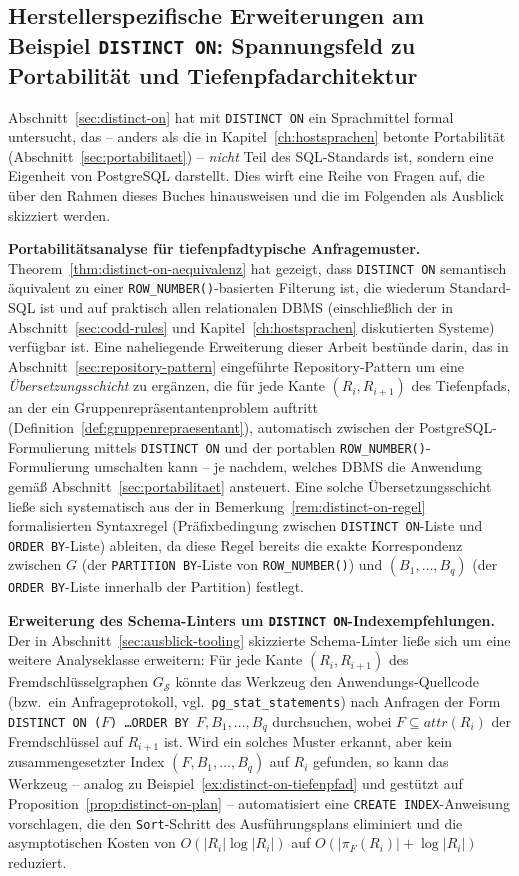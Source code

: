 ﻿\documentclass[a4paper,12pt]{report}
\theoremstyle{definition}
\theoremstyle{remark}
\newcommand{\att}{\mathit{attr}}
\begin{document}
\subsection{Herstellerspezifische Erweiterungen am Beispiel \texttt{DISTINCT ON}: Spannungsfeld zu Portabilität und Tiefenpfadarchitektur}
\label{sec:ausblick-distinct-on}

Abschnitt~\ref{sec:distinct-on} hat mit \texttt{DISTINCT ON} ein
Sprachmittel formal untersucht, das -- anders als die in
Kapitel~\ref{ch:hostsprachen} betonte Portabilität
(Abschnitt~\ref{sec:portabilitaet}) -- \emph{nicht} Teil des
SQL-Standards ist, sondern eine Eigenheit von PostgreSQL darstellt.
Dies wirft eine Reihe von Fragen auf, die über den Rahmen dieses
Buches hinausweisen und die im Folgenden als Ausblick skizziert
werden.

\textbf{Portabilitätsanalyse für tiefenpfadtypische Anfragemuster.}
Theorem~\ref{thm:distinct-on-aequivalenz} hat gezeigt, dass
\texttt{DISTINCT ON} semantisch äquivalent zu einer
\texttt{ROW\_NUMBER()}-basierten Filterung ist, die wiederum
Standard-SQL ist und auf praktisch allen relationalen DBMS
(einschließlich der in Abschnitt~\ref{sec:codd-rules} und
Kapitel~\ref{ch:hostsprachen} diskutierten Systeme) verfügbar ist.
Eine naheliegende Erweiterung dieser Arbeit bestünde darin, das in
Abschnitt~\ref{sec:repository-pattern} eingeführte
Repository-Pattern um eine \emph{Übersetzungsschicht} zu ergänzen,
die für jede Kante $(R_i,R_{i+1})$ des Tiefenpfads, an der ein
Gruppenrepräsentantenproblem auftritt
(Definition~\ref{def:gruppenrepraesentant}), automatisch zwischen der
PostgreSQL-Formulierung mittels \texttt{DISTINCT ON} und der
portablen \texttt{ROW\_NUMBER()}-Formulierung umschalten kann -- je
nachdem, welches DBMS die Anwendung gemäß
Abschnitt~\ref{sec:portabilitaet} ansteuert. Eine solche
Übersetzungsschicht ließe sich systematisch aus der in
Bemerkung~\ref{rem:distinct-on-regel} formalisierten Syntaxregel
(Präfixbedingung zwischen \texttt{DISTINCT ON}-Liste und
\texttt{ORDER BY}-Liste) ableiten, da diese Regel bereits die exakte
Korrespondenz zwischen $G$ (der \texttt{PARTITION BY}-Liste von
\texttt{ROW\_NUMBER()}) und $(B_1,\ldots,B_q)$ (der
\texttt{ORDER BY}-Liste innerhalb der Partition) festlegt.

\textbf{Erweiterung des Schema-Linters um \texttt{DISTINCT
ON}-Indexempfehlungen.}
Der in Abschnitt~\ref{sec:ausblick-tooling} skizzierte
Schema-Linter ließe sich um eine weitere Analyseklasse erweitern: Für
jede Kante $(R_i,R_{i+1})$ des Fremdschlüsselgraphen
$G_{\mathcal{S}}$ könnte das Werkzeug den Anwendungs-Quellcode (bzw.\
ein Anfrageprotokoll, vgl.\ \texttt{pg\_stat\_statements}) nach
Anfragen der Form
\texttt{DISTINCT ON (}$F$\texttt{) \ldots ORDER BY }$F,B_1,\ldots,B_q$
durchsuchen, wobei $F\subseteq\att(R_i)$ der Fremdschlüssel auf
$R_{i+1}$ ist. Wird ein solches Muster erkannt, aber kein
zusammengesetzter Index $(F,B_1,\ldots,B_q)$ auf $R_i$ gefunden, so
kann das Werkzeug -- analog zu
Beispiel~\ref{ex:distinct-on-tiefenpfad} und gestützt auf
Proposition~\ref{prop:distinct-on-plan} -- automatisiert eine
\texttt{CREATE INDEX}-Anweisung vorschlagen, die den
\texttt{Sort}-Schritt des Ausführungsplans eliminiert und die
asymptotischen Kosten von $O(|R_i|\log|R_i|)$ auf
$O(|\pi_{F}(R_i)|+\log|R_i|)$ reduziert.
\end{document}

